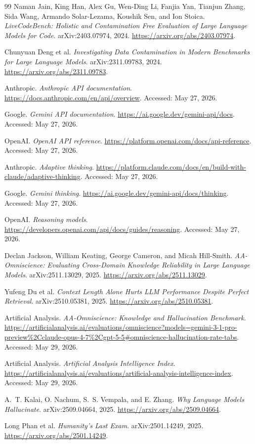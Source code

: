 \documentclass[10pt,letterpaper,twocolumn]{article}
\begin{document}
\begin{thebibliography}{99}
Naman Jain, King Han, Alex Gu, Wen-Ding Li, Fanjia Yan, Tianjun Zhang,
Sida Wang, Armando Solar-Lezama, Koushik Sen, and Ion Stoica.
\emph{LiveCodeBench: Holistic and Contamination Free Evaluation of Large
Language Models for Code}. arXiv:2403.07974, 2024.
\url{https://arxiv.org/abs/2403.07974}.

Chunyuan Deng et al.
\emph{Investigating Data Contamination in Modern Benchmarks for Large Language Models}.
arXiv:2311.09783, 2024.
\url{https://arxiv.org/abs/2311.09783}.

Anthropic. \emph{Anthropic API documentation}.
\url{https://docs.anthropic.com/en/api/overview}. Accessed: May 27, 2026.

Google. \emph{Gemini API documentation}.
\url{https://ai.google.dev/gemini-api/docs}. Accessed: May 27, 2026.

OpenAI. \emph{OpenAI API reference}.
\url{https://platform.openai.com/docs/api-reference}. Accessed: May 27, 2026.

Anthropic. \emph{Adaptive thinking}.
\url{https://platform.claude.com/docs/en/build-with-claude/adaptive-thinking}. Accessed: May 27, 2026.

Google. \emph{Gemini thinking}.
\url{https://ai.google.dev/gemini-api/docs/thinking}. Accessed: May 27, 2026.

OpenAI. \emph{Reasoning models}.
\url{https://developers.openai.com/api/docs/guides/reasoning}. Accessed: May 27, 2026.

Declan Jackson, William Keating, George Cameron, and Micah Hill-Smith.
\emph{AA-Omniscience: Evaluating Cross-Domain Knowledge Reliability in Large Language Models}. arXiv:2511.13029, 2025.
\url{https://arxiv.org/abs/2511.13029}.

Yufeng Du et al.
\emph{Context Length Alone Hurts LLM Performance Despite Perfect Retrieval}.
arXiv:2510.05381, 2025.
\url{https://arxiv.org/abs/2510.05381}.

Artificial Analysis.
\emph{AA-Omniscience: Knowledge and Hallucination Benchmark}.
\url{https://artificialanalysis.ai/evaluations/omniscience?models=gemini-3-1-pro-preview%2Cclaude-opus-4-7%2Cgpt-5-5#omniscience-hallucination-rate-tabs}. Accessed: May 29, 2026.

Artificial Analysis.
\emph{Artificial Analysis Intelligence Index}.
\url{https://artificialanalysis.ai/evaluations/artificial-analysis-intelligence-index}. Accessed: May 29, 2026.

A.~T. Kalai, O. Nachum, S.~S. Vempala, and E. Zhang.
\emph{Why Language Models Hallucinate}. arXiv:2509.04664, 2025.
\url{https://arxiv.org/abs/2509.04664}.

Long Phan et al.
\emph{Humanity's Last Exam}.
arXiv:2501.14249, 2025.
\url{https://arxiv.org/abs/2501.14249}.

\end{thebibliography}
\endgroup
\end{document}
